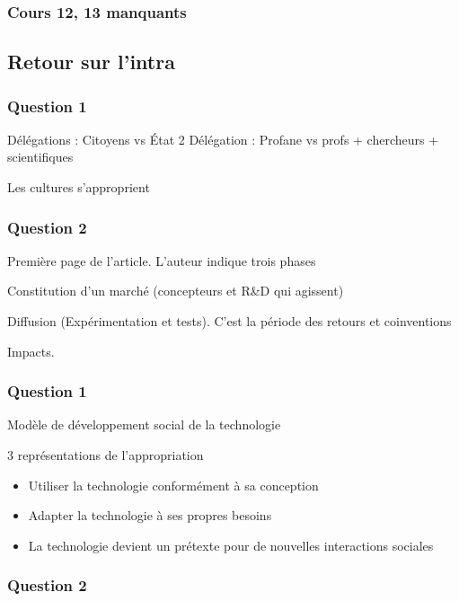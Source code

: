 \documentclass[11pt]{article}
\begin{document}
\subsubsection{Cours 12, 13 manquants}
\label{sec:org91c0053}

\subsection{Retour sur l'intra}
\label{sec:org5aee3c2}

\subsubsection{Question 1}
\label{sec:orgc04cde4}
Délégations : Citoyens vs État
2 Délégation : Profane vs profs + chercheurs + scientifiques

Les cultures s'approprient
\subsubsection{Question 2}
\label{sec:orgaa3e412}

Première page de l'article.  L'auteur indique trois phases

Constitution d'un marché (concepteurs et R\&D qui agissent)

Diffusion (Expérimentation et tests). C'est la période des retours et
coinventions

Impacts.

\subsubsection{Question 1}
\label{sec:org1034a90}

Modèle de développement social de la technologie

3 représentations de l'appropriation
\begin{itemize}
\item Utiliser la technologie conformément à sa conception
\item Adapter la technologie à ses propres besoins
\item La technologie devient un prétexte pour de nouvelles interactions sociales
\end{itemize}

\subsubsection{Question 2}
\label{sec:org33c7449}
\end{document}
